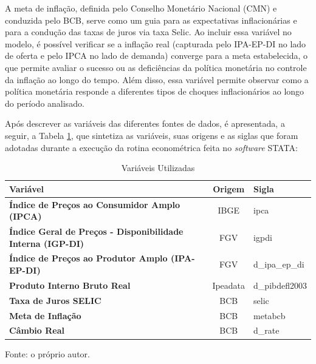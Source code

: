 \documentclass[12pt,oneside,a4paper,chapter=TITLE,english,brazil,sumario=abnt-6027-2012]{abntex2}
\begin{document}
A meta de inflação, definida pelo Conselho Monetário Nacional (CMN) e conduzida pelo BCB, serve como um guia para as expectativas inflacionárias e para a condução das taxas de juros via taxa Selic. Ao incluir essa variável no modelo, é possível verificar se a inflação real (capturada pelo IPA-EP-DI no lado de oferta e pelo IPCA no lado de demanda) converge para a meta estabelecida, o que permite avaliar o sucesso ou as deficiências da política monetária no controle da inflação ao longo do tempo. Além disso, essa variável permite observar como a política monetária responde a diferentes tipos de choques inflacionários ao longo do período analisado.

Após descrever as variáveis das diferentes fontes de dados, é apresentada, a seguir, a Tabela \ref{table:vars}, que sintetiza as variáveis, suas origens e as siglas que foram adotadas durante a execução da rotina econométrica feita no \textit{software} STATA:

\vspace{0.2cm}
\begin{table}[H]
	\caption{Variáveis Utilizadas}
	\centering
	\begin{tabular}{ | l || c | l | }
		\hline
		\textbf{Variável}                                                  & \textbf{Origem} & \textbf{Sigla} \\
		\hline
		\textbf{Índice de Preços ao Consumidor Amplo (IPCA)}               & IBGE            & ipca           \\
		\textbf{Índice Geral de Preços - Disponibilidade Interna (IGP-DI)} & FGV             & igpdi          \\
		\textbf{Índice de Preços ao Produtor Amplo (IPA-EP-DI)}            & FGV             & d\_ipa\_ep\_di \\
		\textbf{Produto Interno Bruto Real}                                & Ipeadata        & d\_pibdefl2003 \\
		\textbf{Taxa de Juros SELIC}                                       & BCB             & selic          \\
		\textbf{Meta de Inflação}                                          & BCB             & metabcb        \\
		\textbf{Câmbio Real}                                               & BCB             & d\_rate        \\
		\hline
	\end{tabular}
	\vspace{1ex}
	\label{table:vars}
	
	\raggedright{
		\noindent \footnotesize{Fonte: o próprio autor.}}
\end{table}
\end{document}
